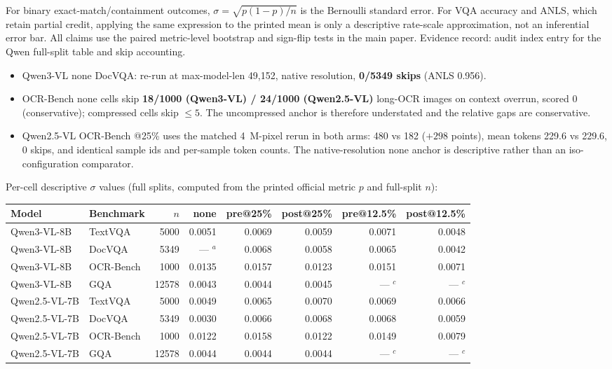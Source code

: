 For binary exact-match/containment outcomes,
$\sigma=\sqrt{p(1-p)/n}$ is the Bernoulli standard error. For VQA accuracy and
ANLS, which retain partial credit, applying the same expression to the printed
mean is only a descriptive rate-scale approximation, not an inferential error
bar. All claims use the paired metric-level bootstrap and sign-flip tests in
the main paper. Evidence record: audit index entry for the Qwen full-split
table and skip accounting.

\begin{itemize}
  \item Qwen3-VL none DocVQA: re-run at max-model-len 49,152, native
    resolution, \textbf{0/5349 skips} (ANLS 0.956).
  \item OCR-Bench none cells skip \textbf{18/1000 (Qwen3-VL) / 24/1000
    (Qwen2.5-VL)} long-OCR images on context overrun, scored 0 (conservative);
    compressed cells skip $\leq 5$. The uncompressed anchor is therefore
    understated and the relative gaps are conservative.
  \item Qwen2.5-VL OCR-Bench @25\% uses the matched 4~M-pixel rerun in both
    arms: 480 vs 182 ($+298$ points), mean tokens 229.6 vs 229.6, 0 skips, and
    identical sample ids and per-sample token counts. The native-resolution
    none anchor is descriptive rather than an iso-configuration comparator.
\end{itemize}

\noindent Per-cell descriptive $\sigma$ values (full splits, computed from the
printed official metric $p$ and full-split $n$):

\begin{table}[ht]
  \centering
  \small
  \begin{tabular}{@{}l l r r r r r r@{}}
    \toprule
    Model & Benchmark & $n$ & none & pre@25\% & post@25\% & pre@12.5\% & post@12.5\% \\
    \midrule
    Qwen3-VL-8B   & TextVQA   & 5000  & 0.0051   & 0.0069 & 0.0059 & 0.0071 & 0.0048 \\
    Qwen3-VL-8B   & DocVQA    & 5349  & --- $^{a}$ & 0.0068 & 0.0058 & 0.0065 & 0.0042 \\
    Qwen3-VL-8B   & OCR-Bench & 1000  & 0.0135   & 0.0157 & 0.0123 & 0.0151 & 0.0071 \\
    Qwen3-VL-8B   & GQA       & 12578 & 0.0043   & 0.0044 & 0.0045 & --- $^{c}$ & --- $^{c}$ \\
    \midrule
    Qwen2.5-VL-7B & TextVQA   & 5000  & 0.0049   & 0.0065 & 0.0070 & 0.0069 & 0.0066 \\
    Qwen2.5-VL-7B & DocVQA    & 5349  & 0.0030   & 0.0066 & 0.0068 & 0.0068 & 0.0059 \\
    Qwen2.5-VL-7B & OCR-Bench & 1000  & 0.0122   & 0.0158 & 0.0122 & 0.0149 & 0.0079 \\
    Qwen2.5-VL-7B & GQA       & 12578 & 0.0044   & 0.0044 & 0.0044 & --- $^{c}$ & --- $^{c}$ \\
    \bottomrule
  \end{tabular}
\end{table}

